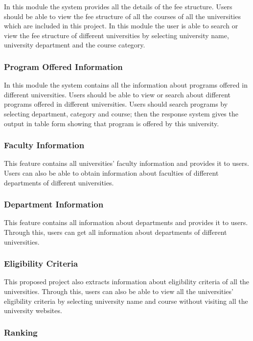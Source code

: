 In this module the system provides all the details of the fee structure. Users should be able to view the fee structure of all the courses of all the universities which are included in this project. In this module the user is able to search or view the fee structure of different universities by selecting university name, university department and the course category.

\subsubsection{Program Offered Information}

In this module the system contains all the information about programs offered in different universities. Users should be able to view or search about different programs offered in different universities. Users should search programs by selecting department, category and course; then the response system gives the output in table form showing that program is offered by this university.

\subsubsection{Faculty Information}

This feature contains all universities' faculty information and provides it to users. Users can also be able to obtain information about faculties of different departments of different universities.

\subsubsection{Department Information}

This feature contains all information about departments and provides it to users. Through this, users can get all information about departments of different universities.

\subsubsection{Eligibility Criteria}

This proposed project also extracts information about eligibility criteria of all the universities. Through this, users can also be able to view all the universities' eligibility criteria by selecting university name and course without visiting all the university websites.

\subsubsection{Ranking}


